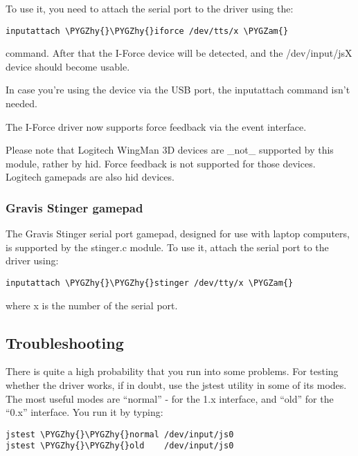 \documentclass[a4paper,8pt,english]{sphinxmanual}
\def\PYGZam{\char`\&}
\def\PYGZhy{\char`\-}
\begin{document}
To use it, you need to attach the serial port to the driver using the:

\begin{Verbatim}[commandchars=\\\{\}]
inputattach \PYGZhy{}\PYGZhy{}iforce /dev/tts/x \PYGZam{}
\end{Verbatim}

command. After that the I-Force device will be detected, and the
/dev/input/jsX device should become usable.

In case you're using the device via the USB port, the inputattach command
isn't needed.

The I-Force driver now supports force feedback via the event interface.

Please note that Logitech WingMan 3D devices are \_not\_ supported by this
module, rather by hid. Force feedback is not supported for those devices.
Logitech gamepads are also hid devices.


\subsubsection{Gravis Stinger gamepad}
\label{input/joydev/joystick:gravis-stinger-gamepad}
The Gravis Stinger serial port gamepad, designed for use with laptop
computers, is supported by the stinger.c module. To use it, attach the
serial port to the driver using:

\begin{Verbatim}[commandchars=\\\{\}]
inputattach \PYGZhy{}\PYGZhy{}stinger /dev/tty/x \PYGZam{}
\end{Verbatim}

where x is the number of the serial port.


\subsection{Troubleshooting}
\label{input/joydev/joystick:troubleshooting}
There is quite a high probability that you run into some problems. For
testing whether the driver works, if in doubt, use the jstest utility in
some of its modes. The most useful modes are ``normal'' - for the 1.x
interface, and ``old'' for the ``0.x'' interface. You run it by typing:

\begin{Verbatim}[commandchars=\\\{\}]
jstest \PYGZhy{}\PYGZhy{}normal /dev/input/js0
jstest \PYGZhy{}\PYGZhy{}old    /dev/input/js0
\end{Verbatim}
\end{document}
